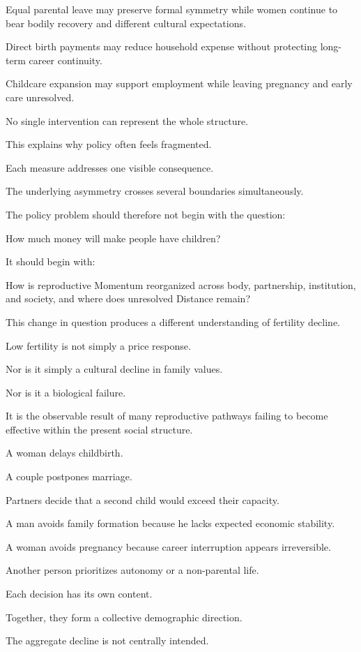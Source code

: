 Equal parental leave may preserve formal symmetry while women continue to bear bodily recovery and different cultural expectations.

Direct birth payments may reduce household expense without protecting long-term career continuity.

Childcare expansion may support employment while leaving pregnancy and early care unresolved.

No single intervention can represent the whole structure.

This explains why policy often feels fragmented.

Each measure addresses one visible consequence.

The underlying asymmetry crosses several boundaries simultaneously.

The policy problem should therefore not begin with the question:

How much money will make people have children?

It should begin with:

How is reproductive Momentum reorganized across body, partnership, institution, and society, and where does unresolved Distance remain?

This change in question produces a different understanding of fertility decline.

Low fertility is not simply a price response.

Nor is it simply a cultural decline in family values.

Nor is it a biological failure.

It is the observable result of many reproductive pathways failing to become effective within the present social structure.

A woman delays childbirth.

A couple postpones marriage.

Partners decide that a second child would exceed their capacity.

A man avoids family formation because he lacks expected economic stability.

A woman avoids pregnancy because career interruption appears irreversible.

Another person prioritizes autonomy or a non-parental life.

Each decision has its own content.

Together, they form a collective demographic direction.

The aggregate decline is not centrally intended.

